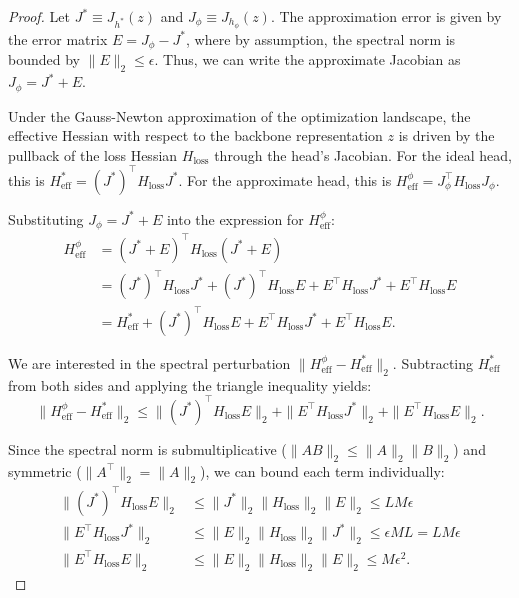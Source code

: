 \documentclass{article}
\theoremstyle{plain}
\theoremstyle{definition}
\theoremstyle{remark}
\begin{document}
\begin{proof}
Let $J^* \equiv J_{h^*}(z)$ and $J_\phi \equiv J_{h_\phi}(z)$. The approximation error is given by the error matrix $E = J_\phi - J^*$, where by assumption, the spectral norm is bounded by $\| E \|_2 \le \epsilon$. 
Thus, we can write the approximate Jacobian as $J_\phi = J^* + E$.

Under the Gauss-Newton approximation of the optimization landscape, the effective Hessian with respect to the backbone representation $z$ is driven by the pullback of the loss Hessian $H_{\text{loss}}$ through the head's Jacobian. 
For the ideal head, this is $H_{\text{eff}}^* = (J^*)^\top H_{\text{loss}} J^*$. 
For the approximate head, this is $H_{\text{eff}}^\phi = J_\phi^\top H_{\text{loss}} J_\phi$.

Substituting $J_\phi = J^* + E$ into the expression for $H_{\text{eff}}^\phi$:
\begin{align*}
    H_{\text{eff}}^\phi &= (J^* + E)^\top H_{\text{loss}} (J^* + E) \\
    &= (J^*)^\top H_{\text{loss}} J^* + (J^*)^\top H_{\text{loss}} E + E^\top H_{\text{loss}} J^* + E^\top H_{\text{loss}} E \\
    &= H_{\text{eff}}^* + (J^*)^\top H_{\text{loss}} E + E^\top H_{\text{loss}} J^* + E^\top H_{\text{loss}} E.
\end{align*}

We are interested in the spectral perturbation $\| H_{\text{eff}}^\phi - H_{\text{eff}}^* \|_2$. Subtracting $H_{\text{eff}}^*$ from both sides and applying the triangle inequality yields:
\begin{equation*}
    \| H_{\text{eff}}^\phi - H_{\text{eff}}^* \|_2 \le \| (J^*)^\top H_{\text{loss}} E \|_2 + \| E^\top H_{\text{loss}} J^* \|_2 + \| E^\top H_{\text{loss}} E \|_2.
\end{equation*}

Since the spectral norm is submultiplicative ($\|AB\|_2 \le \|A\|_2 \|B\|_2$) and symmetric ($\|A^\top\|_2 = \|A\|_2$), we can bound each term individually:
\begin{align*}
    \| (J^*)^\top H_{\text{loss}} E \|_2 &\le \| J^* \|_2 \| H_{\text{loss}} \|_2 \| E \|_2 \le L M \epsilon \\
    \| E^\top H_{\text{loss}} J^* \|_2 &\le \| E \|_2 \| H_{\text{loss}} \|_2 \| J^* \|_2 \le \epsilon M L = L M \epsilon \\
    \| E^\top H_{\text{loss}} E \|_2 &\le \| E \|_2 \| H_{\text{loss}} \|_2 \| E \|_2 \le M \epsilon^2.
\end{align*}


\end{proof}
\end{document}

